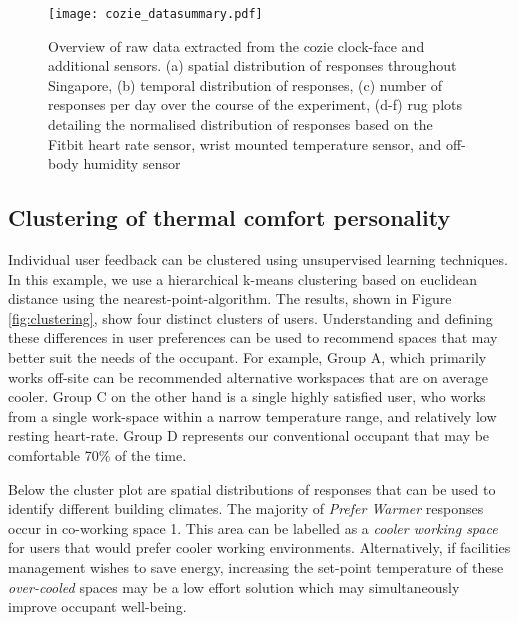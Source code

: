 \begin{figure}
\begin{center}
\texttt{[image: cozie\_datasummary.pdf]}
\caption{Overview of raw data extracted from the cozie clock-face and additional sensors. (a) spatial distribution of responses throughout Singapore, (b) temporal distribution of responses, (c) number of responses per day over the course of the experiment, (d-f) rug plots detailing the normalised distribution of responses based on the Fitbit heart rate sensor, wrist mounted temperature sensor, and off-body humidity sensor }
\label{fig:summary}
\end{center}
\end{figure}



\subsection{Clustering of thermal comfort personality}
\label{ch:userResults}
Individual user feedback can be clustered using unsupervised learning techniques. In this example, we use a hierarchical k-means clustering based on euclidean distance using the nearest-point-algorithm. The results, shown in Figure \ref{fig:clustering}, show four distinct clusters of users. 
Understanding and defining these differences in user preferences can be used to recommend spaces that may better suit the needs of the occupant. For example, Group A, which primarily works off-site can be recommended alternative workspaces that are on average cooler. Group C on the other hand is a single highly satisfied user, who works from a single work-space within a narrow temperature range, and relatively low resting heart-rate. Group D represents our conventional occupant that may be comfortable 70\% of the time. 

Below the cluster plot are spatial distributions of responses that can be used to identify different building climates. The majority of \emph{Prefer Warmer} responses occur in co-working space 1. This area can be labelled as a \emph{cooler working space} for users that would prefer cooler working environments. Alternatively, if facilities management wishes to save energy, increasing the set-point temperature of these \emph{over-cooled} spaces may be a low effort solution which may simultaneously improve occupant well-being. 


